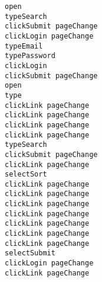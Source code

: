 \begin{lstlisting}
open 
typeSearch 
clickSubmit pageChange
clickLogin pageChange
typeEmail 
typePassword 
clickLogin 
clickSubmit pageChange
open 
type 
clickLink pageChange
clickLink pageChange
clickLink pageChange
clickLink pageChange
typeSearch 
clickSubmit pageChange
clickLink pageChange
selectSort 
clickLink pageChange
clickLink pageChange
clickLink pageChange
clickLink pageChange
clickLink pageChange
clickLink pageChange
clickLink pageChange
selectSubmit 
clickLogin pageChange
clickLink pageChange
\end{lstlisting}

